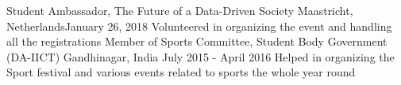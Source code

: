 \begin{cventries}
\cventry
{Student Ambassador, The Future of a Data-Driven Society}
{}
{Maastricht, Netherlands}{January 26, 2018}
{Volunteered in organizing the event and handling all the registrations}
\cventry
    {Member of Sports Committee, Student Body Government (DA-IICT)}
    {}
    {Gandhinagar, India}
    {July 2015 - April 2016}
    {
      Helped in organizing the Sport festival and various events related to sports the whole year round
    }
\end{cventries}